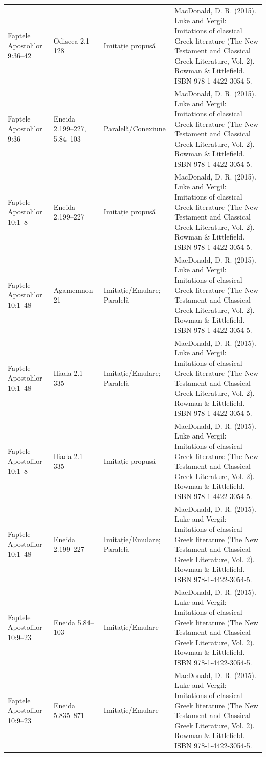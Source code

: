 \documentclass[12pt,a4paper,twoside,openany]{book}
\begin{document}
\begin{longtable}{L{1.4cm}L{1.7cm}L{3.1cm}L{8.4cm}}
Faptele Apostolilor 9:36–42 & Odiseea 2.1–128 & Imitație propusă & MacDonald, D. R. (2015). Luke and Vergil: Imitations of classical Greek literature (The New Testament and Classical Greek Literature, Vol. 2). Rowman \& Littlefield. ISBN 978-1-4422-3054-5. \\
Faptele Apostolilor 9:36 & Eneida 2.199–227, 5.84–103 & Paralelă/Conexiune & MacDonald, D. R. (2015). Luke and Vergil: Imitations of classical Greek literature (The New Testament and Classical Greek Literature, Vol. 2). Rowman \& Littlefield. ISBN 978-1-4422-3054-5. \\
Faptele Apostolilor 10:1–8 & Eneida 2.199–227 & Imitație propusă & MacDonald, D. R. (2015). Luke and Vergil: Imitations of classical Greek literature (The New Testament and Classical Greek Literature, Vol. 2). Rowman \& Littlefield. ISBN 978-1-4422-3054-5. \\
Faptele Apostolilor 10:1–48 & Agamemnon 21 & Imitație/Emulare; Paralelă & MacDonald, D. R. (2015). Luke and Vergil: Imitations of classical Greek literature (The New Testament and Classical Greek Literature, Vol. 2). Rowman \& Littlefield. ISBN 978-1-4422-3054-5. \\
Faptele Apostolilor 10:1–48 & Iliada 2.1–335 & Imitație/Emulare; Paralelă & MacDonald, D. R. (2015). Luke and Vergil: Imitations of classical Greek literature (The New Testament and Classical Greek Literature, Vol. 2). Rowman \& Littlefield. ISBN 978-1-4422-3054-5. \\
Faptele Apostolilor 10:1–8 & Iliada 2.1–335 & Imitație propusă & MacDonald, D. R. (2015). Luke and Vergil: Imitations of classical Greek literature (The New Testament and Classical Greek Literature, Vol. 2). Rowman \& Littlefield. ISBN 978-1-4422-3054-5. \\
Faptele Apostolilor 10:1–48 & Eneida 2.199–227 & Imitație/Emulare; Paralelă & MacDonald, D. R. (2015). Luke and Vergil: Imitations of classical Greek literature (The New Testament and Classical Greek Literature, Vol. 2). Rowman \& Littlefield. ISBN 978-1-4422-3054-5. \\
Faptele Apostolilor 10:9–23 & Eneida 5.84–103 & Imitație/Emulare & MacDonald, D. R. (2015). Luke and Vergil: Imitations of classical Greek literature (The New Testament and Classical Greek Literature, Vol. 2). Rowman \& Littlefield. ISBN 978-1-4422-3054-5. \\
Faptele Apostolilor 10:9–23 & Eneida 5.835–871 & Imitație/Emulare & MacDonald, D. R. (2015). Luke and Vergil: Imitations of classical Greek literature (The New Testament and Classical Greek Literature, Vol. 2). Rowman \& Littlefield. ISBN 978-1-4422-3054-5. \\

\end{longtable}
\end{document}
